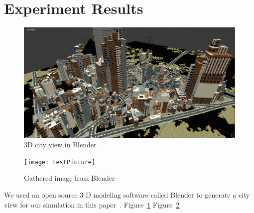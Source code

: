 \section{Experiment Results}
\label{sec:ExperimentResults}
\begin{figure}
\begin{center}
\includegraphics[width=0.95\columnwidth]{cityView.png}
\caption{\label{fig:cityView}3D city view in Blender}
\end{center}
\end{figure}
\begin{figure}
\begin{center}
\texttt{[image: testPicture]}
\caption{\label{fig:gatheredImage}Gathered image from Blender}
\end{center}
\end{figure}
We used an open source 3-D modeling software called Blender to generate a city
view for our simulation in this paper~\cite{Blender}.
Figure~\ref{fig:cityView}
Figure~\ref{fig:gatheredImage}